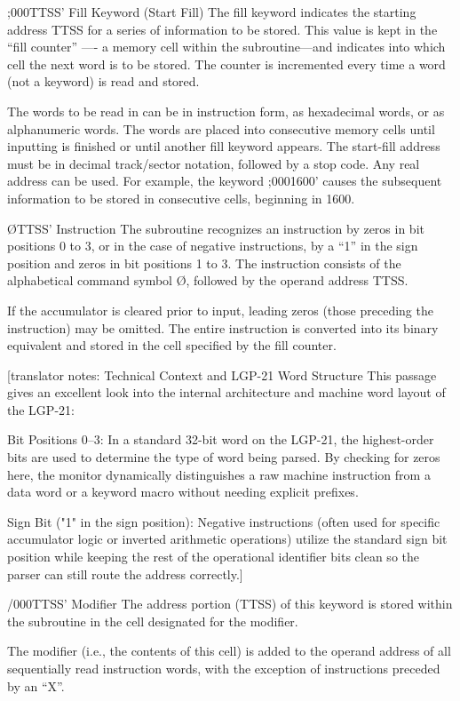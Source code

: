\documentclass{article}
\begin{document}
\begin{enumerate}
;000TTSS' Fill Keyword (Start Fill)
The fill keyword indicates the starting address TTSS for a series of information to be stored. This value is kept in the ``fill counter'' —- a memory cell within the subroutine—and indicates into which cell the next word is to be stored. The counter is incremented every time a word (not a keyword) is read and stored.

The words to be read in can be in instruction form, as hexadecimal words, or as alphanumeric words. The words are placed into consecutive memory cells until inputting is finished or until another fill keyword appears. The start-fill address must be in decimal track/sector notation, followed by a stop code. Any real address can be used. For example, the keyword ;0001600' causes the subsequent information to be stored in consecutive cells, beginning in 1600.

ØTTSS' Instruction
The subroutine recognizes an instruction by zeros in bit positions 0 to 3, or in the case of negative instructions, by a ``1'' in the sign position and zeros in bit positions 1 to 3. The instruction consists of the alphabetical command symbol Ø, followed by the operand address TTSS.

If the accumulator is cleared prior to input, leading zeros (those preceding the instruction) may be omitted. The entire instruction is converted into its binary equivalent and stored in the cell specified by the fill counter.

[translator notes: Technical Context and LGP-21 Word Structure
This passage gives an excellent look into the internal architecture and machine word layout of the LGP-21:

Bit Positions 0–3: In a standard 32-bit word on the LGP-21, the highest-order bits are used to determine the type of word being parsed. By checking for zeros here, the monitor dynamically distinguishes a raw machine instruction from a data word or a keyword macro without needing explicit prefixes.

Sign Bit ("1" in the sign position): Negative instructions (often used for specific accumulator logic or inverted arithmetic operations) utilize the standard sign bit position while keeping the rest of the operational identifier bits clean so the parser can still route the address correctly.]

/000TTSS' Modifier
The address portion (TTSS) of this keyword is stored within the subroutine in the cell designated for the modifier.

The modifier (i.e., the contents of this cell) is added to the operand address of all sequentially read instruction words, with the exception of instructions preceded by an ``X''.


\end{enumerate}
\end{document}
